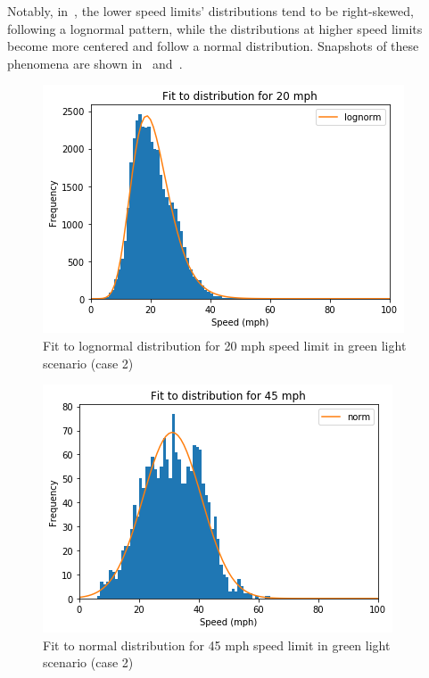 \documentclass[final]{IEEEtran}
\begin{document}


Notably, in~, the lower speed limits' distributions tend to be right-skewed, following a lognormal pattern, while the distributions at higher speed limits become more centered and follow a normal distribution. Snapshots of these phenomena are shown in~ and~.

\begin{figure}
    \centering
    \includegraphics[width=.45\textwidth]{figs/lognormal_dist_20_mph_green_light.png}
    \caption{Fit to lognormal distribution for 20 mph speed limit in green light scenario (case 2)}
    \label{fig:lognormal_20_mph_green_light}
\end{figure}

\begin{figure}
    \centering
    \includegraphics[width=.45\textwidth]{figs/normal_dist_45_mph_green_light.png}
    \caption{Fit to normal distribution for 45 mph speed limit in green light scenario (case 2)}
    \label{fig:normal_45_mph_green_light}
\end{figure}
\end{document}
